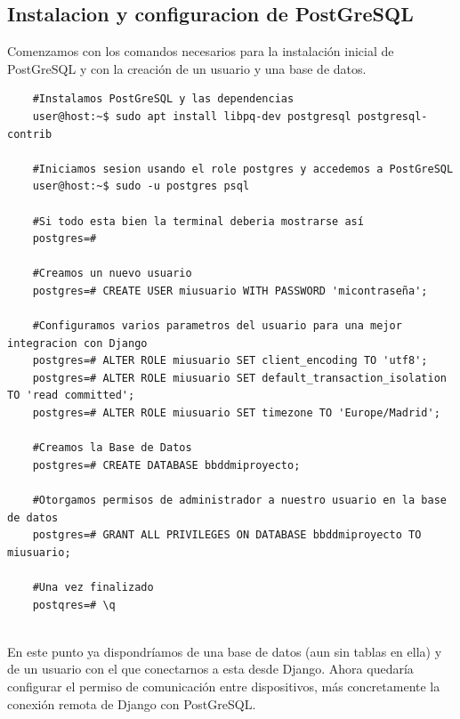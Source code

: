 \subsection{Instalacion y configuracion de PostGreSQL}
Comenzamos con los comandos necesarios para la instalación inicial de PostGreSQL y con la creación de un usuario y una base de datos.
\begin{verbatim}
	#Instalamos PostGreSQL y las dependencias
	user@host:~$ sudo apt install libpq-dev postgresql postgresql-contrib
	
	#Iniciamos sesion usando el role postgres y accedemos a PostGreSQL
	user@host:~$ sudo -u postgres psql
	
	#Si todo esta bien la terminal deberia mostrarse así
	postgres=# 
	
	#Creamos un nuevo usuario
	postgres=# CREATE USER miusuario WITH PASSWORD 'micontraseña';
	
	#Configuramos varios parametros del usuario para una mejor integracion con Django
	postgres=# ALTER ROLE miusuario SET client_encoding TO 'utf8';
	postgres=# ALTER ROLE miusuario SET default_transaction_isolation TO 'read committed';
	postgres=# ALTER ROLE miusuario SET timezone TO 'Europe/Madrid';
	
	#Creamos la Base de Datos
	postgres=# CREATE DATABASE bbddmiproyecto;
	
	#Otorgamos permisos de administrador a nuestro usuario en la base de datos
	postgres=# GRANT ALL PRIVILEGES ON DATABASE bbddmiproyecto TO miusuario;
	
	#Una vez finalizado
	postqres=# \q
	
\end{verbatim}

En este punto ya dispondríamos de una base de datos (aun sin tablas en ella) y de un usuario con el que conectarnos a esta desde Django.\newline
\newline
Ahora quedaría configurar el permiso de comunicación entre dispositivos, más concretamente la conexión remota de Django con PostGreSQL.

